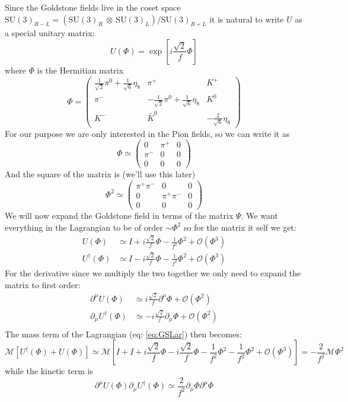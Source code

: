\documentclass[a4,10pt,titlepage]{article}
\renewcommand\[{\begin{equation*}}
\renewcommand\]{\end{equation*}}
\newcommand{\be}{\begin{equation}}
\newcommand{\ee}{\end{equation}}
\numberwithin{equation}{section}
\newcommand{\ot}{\:\otimes\:}
\newcommand{\lp}{\left}
\newcommand{\rp}{\right}
\begin{document}
Since the Goldstone fields live in the coset space $\text{SU}(3)_{R-L}=(\text{SU}(3)_R\ot \text{SU}(3)_L)/\text{SU}(3)_{R+L}$ it is natural to write $U$ as a special unitary matrix:
\be
U(\Phi)=\exp[i\frac{\sqrt{2}}{f}\Phi]
\ee
where $\Phi$ is the Hermitian matrix
\be
\Phi=\begin{pmatrix}
    \frac{1}{\sqrt{2}}\pi^0+\frac{1}{\sqrt{6}}\eta_8 & \pi^+ & K^+\\
    \pi^-& -\frac{1}{\sqrt{2}}\pi^0+\frac{1}{\sqrt{6}}\eta_8& K^0\\
    K^-&\bar{K}^0 &-\frac{2}{\sqrt{6}}\eta_8
\end{pmatrix}
\ee
For our purpose we are only interested in the Pion fields, so we can write it as
\be
\Phi\simeq\begin{pmatrix}
    0 & \pi^+ & 0\\
    \pi^-& 0 & 0\\
    0 & 0 & 0
\end{pmatrix}
\ee
And the square of the matrix is (we'll use this later)
\be
\Phi^2\simeq\begin{pmatrix}
    \pi^+\pi^- & 0 & 0\\
    0 & \pi^+\pi^- & 0\\
    0 & 0 & 0
\end{pmatrix}
\ee
We will now expand the Goldstone field in terms of the matrix $\Psi$. We want everything in the Lagrangian to be of order $\sim \Phi^2$ so for the matrix it self we get:
\begin{align*}
U(\Phi)&\simeq I+i\frac{\sqrt{2}}{f}\Phi-\frac{1}{f^2}\Phi^2+\mathcal{O}(\Phi^3)\\
U^\dagger(\Phi)&\simeq I-i\frac{\sqrt{2}}{f}\Phi-\frac{1}{f^2}\Phi^2+\mathcal{O}(\Phi^3)
\end{align*}
For the derivative since we multiply the two together we only need to expand the matrix to first order:
\begin{align*}
\partial^\mu U(\Phi)&\simeq i\frac{\sqrt{2}}{f}\partial^\mu\Phi+\mathcal{O}(\Phi^2)\\
\partial_\mu U^\dagger(\Phi)&\simeq -i\frac{\sqrt{2}}{f}\partial_\mu\Phi+\mathcal{O}(\Phi^2)\\
\end{align*}
The mass term of the Lagrangian (eq: \ref{eq:GSLar}) then becomes:
\[
\mathcal{M}\lp[U^\dagger(\Phi)+U(\Phi) \rp]\simeq \mathcal{M}\lp[ I+I+i\frac{\sqrt{2}}{f}\Phi-i\frac{\sqrt{2}}{f}\Phi-\frac{1}{f^2}\Phi^2-\frac{1}{f^2}\Phi^2+\mathcal{O}(\Phi^3) \rp]=-\frac{2}{f^2}\mathcal{M} \Phi^2
\]
while the kinetic term is
\[
\partial^\mu U(\Phi)\partial_\mu U^\dagger(\Phi)\simeq\frac{2}{f^2}\partial_\mu\Phi\partial^\mu\Phi
\]
\end{document}
